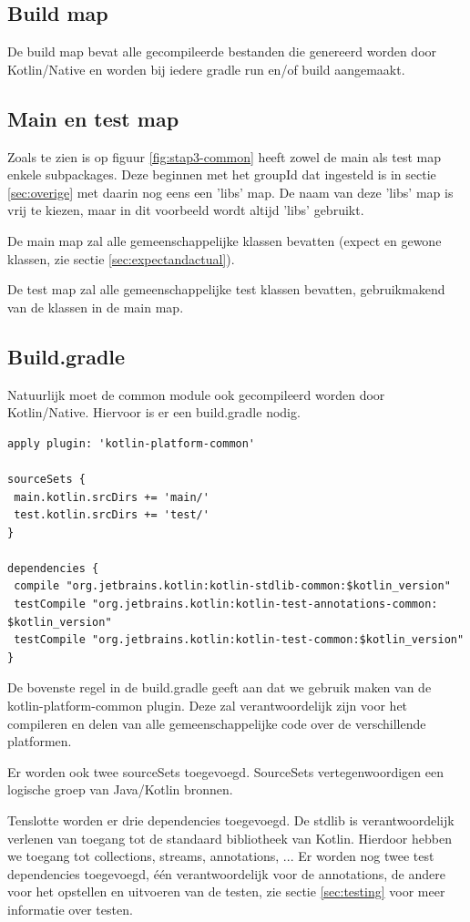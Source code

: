 \subsection{Build map}
De build map bevat alle gecompileerde bestanden die genereerd worden door Kotlin/Native en worden bij iedere gradle run en/of build aangemaakt.

\subsection{Main en test map}
\label{sec:maintestcommon}
Zoals te zien is op figuur \ref{fig:stap3-common} heeft zowel de main als test map enkele subpackages. Deze beginnen met het groupId dat ingesteld is in sectie \ref{sec:overige} met daarin nog eens een 'libs' map. De naam van deze 'libs' map is vrij te kiezen, maar in dit voorbeeld wordt altijd 'libs' gebruikt.

De main map zal alle gemeenschappelijke klassen bevatten (expect en gewone klassen, zie sectie \ref{sec:expectandactual}).

De test map zal alle gemeenschappelijke test klassen bevatten, gebruikmakend van de klassen in de main map.

\subsection{Build.gradle}
Natuurlijk moet de common module ook gecompileerd worden door Kotlin/Native. Hiervoor is er een build.gradle nodig.

\begin{lstlisting}
apply plugin: 'kotlin-platform-common'

sourceSets {
 main.kotlin.srcDirs += 'main/'
 test.kotlin.srcDirs += 'test/'
}

dependencies {
 compile "org.jetbrains.kotlin:kotlin-stdlib-common:$kotlin_version"
 testCompile "org.jetbrains.kotlin:kotlin-test-annotations-common: $kotlin_version"
 testCompile "org.jetbrains.kotlin:kotlin-test-common:$kotlin_version"
}
\end{lstlisting}
De bovenste regel in de build.gradle geeft aan dat we gebruik maken van de kotlin-platform-common plugin. Deze zal verantwoordelijk zijn voor het compileren en delen van alle gemeenschappelijke code over de verschillende platformen.

Er worden ook twee sourceSets toegevoegd. SourceSets vertegenwoordigen een logische groep van Java/Kotlin bronnen.

Tenslotte worden er drie dependencies toegevoegd. De stdlib is verantwoordelijk verlenen van toegang tot de standaard bibliotheek van Kotlin. Hierdoor hebben we toegang tot collections, streams, annotations, ... Er worden nog twee test dependencies toegevoegd, één verantwoordelijk voor de annotations, de andere voor het opstellen en uitvoeren van de testen, zie sectie \ref{sec:testing} voor meer informatie over testen.


